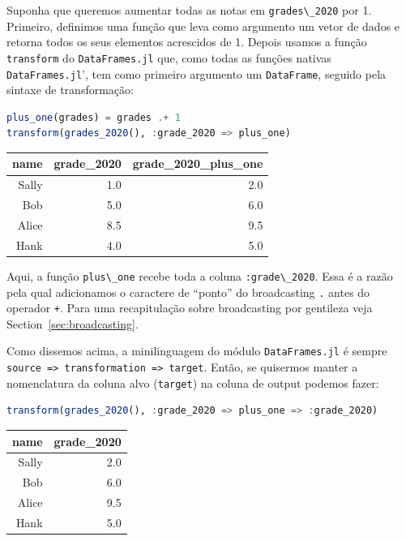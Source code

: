 \documentclass[
  notoc %
]{tufte-book}
\newcommand{\passthrough}[1]{#1}
\begin{document}
Suponha que queremos aumentar todas as notas em
\passthrough{\lstinline!grades\_2020!} por 1. Primeiro, definimos uma
função que leva como argumento um vetor de dados e retorna todos os seus
elementos acrescidos de 1. Depois usamos a função
\passthrough{\lstinline!transform!} do
\passthrough{\lstinline!DataFrames.jl!} que, como todas as funções
nativas \passthrough{\lstinline!DataFrames.jl!}', tem como primeiro
argumento um \passthrough{\lstinline!DataFrame!}, seguido pela sintaxe
de transformação:

\begin{lstlisting}[language=Julia]
plus_one(grades) = grades .+ 1
transform(grades_2020(), :grade_2020 => plus_one)
\end{lstlisting}

\begin{longtable}[]{@{}rrr@{}}
\toprule
name & grade\_2020 & grade\_2020\_plus\_one \\
\midrule
\endhead
Sally & 1.0 & 2.0 \\
Bob & 5.0 & 6.0 \\
Alice & 8.5 & 9.5 \\
Hank & 4.0 & 5.0 \\
\bottomrule
\end{longtable}

Aqui, a função \passthrough{\lstinline!plus\_one!} recebe toda a coluna
\passthrough{\lstinline!:grade\_2020!}. Essa é a razão pela qual
adicionamos o caractere de ``ponto'' do broadcasting
\passthrough{\lstinline!.!} antes do operador
\passthrough{\lstinline!+!}. Para uma recapitulação sobre broadcasting
por gentileza veja Section~\ref{sec:broadcasting}.

Como dissemos acima, a minilinguagem do módulo
\passthrough{\lstinline!DataFrames.jl!} é sempre
\passthrough{\lstinline!source => transformation => target!}. Então, se
quisermos manter a nomenclatura da coluna alvo
(\passthrough{\lstinline!target!}) na coluna de output podemos fazer:

\begin{lstlisting}[language=Julia]
transform(grades_2020(), :grade_2020 => plus_one => :grade_2020)
\end{lstlisting}

\begin{longtable}[]{@{}rr@{}}
\toprule
name & grade\_2020 \\
\midrule
\endhead
Sally & 2.0 \\
Bob & 6.0 \\
Alice & 9.5 \\
Hank & 5.0 \\
\bottomrule
\end{longtable}
\end{document}
